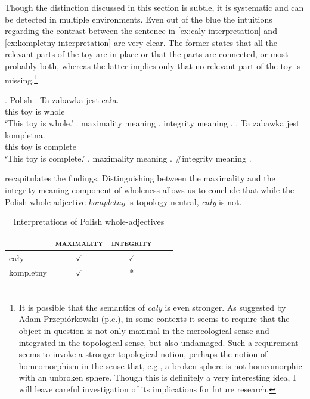 Though the distinction discussed in this section is subtle, it is systematic and can be detected in multiple environments. Even out of the blue the intuitions regarding the contrast between the sentence in \ref{ex:caly-interpretation} and \ref{ex:kompletny-interpretation} are very clear. The former states that all the relevant parts of the toy are in place or that the parts are connected, or most probably both, whereas the latter implies only that no relevant part of the toy is missing.\footnote{It is possible that the semantics of \textit{cały} is even stronger. As suggested by Adam Przepiórkowski (p.c.), in some contexts it seems to require that the object in question is not only maximal in the mereological sense and integrated in the topological sense, but also undamaged. Such a requirement seems to invoke a stronger topological notion, perhaps the notion of homeomorphism in the sense that, e.g., a broken sphere is not homeomorphic with an unbroken sphere. Though this is definitely a very interesting idea, I will leave careful investigation of its implications for future research.}\largerpage
		
		\ex. Polish\label{ex:caly-kompletny-interpretation}
        \ag. Ta zabawka jest cała.\label{ex:caly-interpretation}\\
		this toy is whole\\
		`This toy is whole.'
		\a. maximality meaning
		\b. integrity meaning
		\z.
		\bg. Ta zabawka jest kompletna.\label{ex:kompletny-interpretation}\\
		this toy is complete\\
		`This toy is complete.'
		\a. maximality meaning
		\b. \#integrity meaning
        \z.

 recapitulates the findings. Distinguishing between the maximality and the integrity meaning component of wholeness allows us to conclude that while the Polish whole-adjective \textit{kompletny} is topology-neutral, \textit{cały} is not.  

		\begin{table}[h]
			\centering
			\begin{tabular}{lcccc}
				\lsptoprule
				& \textsc{maximality} & \textsc{integrity} \\ \midrule
				cały  & $\checked$    & $\checked$  \\
				kompletny & $\checked$   & * \\ \lspbottomrule
			\end{tabular}
			\caption{Interpretations of Polish whole-adjectives}
            \label{tab:interpretations-of-polish-whole-adjectives}
		\end{table}

